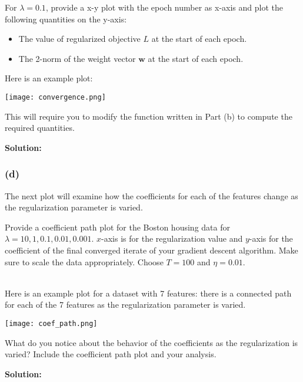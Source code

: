 \documentclass[11pt]{article}
\begin{document}
	 For $\lambda = 0.1$, 
	provide a x-y
	plot with the epoch number as x-axis and plot the following quantities on the y-axis:
	\begin{itemize}
		\item The value of regularized objective $L$ at the start of each epoch.
		\item The 2-norm of the weight vector $\mathbf{w}$ at the start of each epoch.
	\end{itemize}

	Here is an example plot:
	
	\texttt{[image: convergence.png]}
	
	This will require you to modify the function written in Part (b) to compute the required
	quantities.
	
	{\noindent \bf Solution: }
	
	\vfill
	
\subsubsection*{(d)}
The next plot will examine how the coefficients for each of the features change as the
	regularization parameter is varied. 
	
	Provide a coefficient path plot for the Boston housing data for $\lambda = 10, 1, 0.1, 0.01, 0.001$.
	$x$-axis is for the regularization value and $y$-axis
	for the coefficient of the final converged iterate of your gradient descent algorithm. 
	Make sure to scale the data appropriately. Choose $T = 100$ and $\eta = 0.01$.
	
	\ \\
	Here is an example plot for a dataset with 7 features: there is a connected path for each
	of the 7 features as the regularization parameter is varied.
	
	\texttt{[image: coef\_path.png]}
		
	
	What do you notice about the behavior of the coefficients
	as the regularization is varied? Include the coefficient path plot and your analysis.

{\noindent \bf Solution: }
\end{document}

